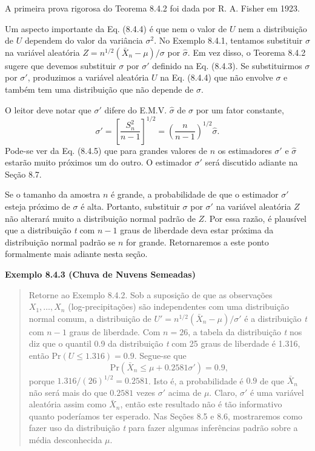 \vspace{1em}
A primeira prova rigorosa do Teorema 8.4.2 foi dada por R. A. Fisher em 1923.

Um aspecto importante da Eq. (8.4.4) é que nem o valor de $U$ nem a distribuição de $U$ dependem do valor da variância $\sigma^2$. No Exemplo 8.4.1, tentamos substituir $\sigma$ na variável aleatória $Z = n^{1/2}(\bar{X}_n - \mu)/\sigma$ por $\hat{\sigma}$. Em vez disso, o Teorema 8.4.2 sugere que devemos substituir $\sigma$ por $\sigma'$ definido na Eq. (8.4.3). Se substituirmos $\sigma$ por $\sigma'$, produzimos a variável aleatória $U$ na Eq. (8.4.4) que não envolve $\sigma$ e também tem uma distribuição que não depende de $\sigma$.

O leitor deve notar que $\sigma'$ difere do E.M.V. $\hat{\sigma}$ de $\sigma$ por um fator constante,
\begin{equation}
    \sigma' = \left[\frac{S_n^2}{n-1}\right]^{1/2} = \left(\frac{n}{n-1}\right)^{1/2} \hat{\sigma}.
\end{equation}
Pode-se ver da Eq. (8.4.5) que para grandes valores de $n$ os estimadores $\sigma'$ e $\hat{\sigma}$ estarão muito próximos um do outro. O estimador $\sigma'$ será discutido adiante na Seção 8.7.

Se o tamanho da amostra $n$ é grande, a probabilidade de que o estimador $\sigma'$ esteja próximo de $\sigma$ é alta. Portanto, substituir $\sigma$ por $\sigma'$ na variável aleatória $Z$ não alterará muito a distribuição normal padrão de $Z$. Por essa razão, é plausível que a distribuição \textit{t} com $n-1$ graus de liberdade deva estar próxima da distribuição normal padrão se $n$ for grande. Retornaremos a este ponto formalmente mais adiante nesta seção.

\vspace{1em}
\noindent\textbf{Exemplo 8.4.3 (Chuva de Nuvens Semeadas)}
\begin{quote}
    Retorne ao Exemplo 8.4.2. Sob a suposição de que as observações $X_1, \dots, X_n$ (log-precipitações) são independentes com uma distribuição normal comum, a distribuição de $U' = n^{1/2}(\bar{X}_n - \mu)/\sigma'$ é a distribuição \textit{t} com $n-1$ graus de liberdade. Com $n=26$, a tabela da distribuição \textit{t} nos diz que o quantil 0.9 da distribuição \textit{t} com 25 graus de liberdade é 1.316, então $\text{Pr}(U \le 1.316) = 0.9$. Segue-se que
    $$
    \text{Pr}(\bar{X}_n \le \mu + 0.2581\sigma') = 0.9,
    $$
    porque $1.316/(26)^{1/2} = 0.2581$. Isto é, a probabilidade é $0.9$ de que $\bar{X}_n$ não será mais do que $0.2581$ vezes $\sigma'$ acima de $\mu$. Claro, $\sigma'$ é uma variável aleatória assim como $\bar{X}_n$, então este resultado não é tão informativo quanto poderíamos ter esperado. Nas Seções 8.5 e 8.6, mostraremos como fazer uso da distribuição \textit{t} para fazer algumas inferências padrão sobre a média desconhecida $\mu$.
\end{quote}
\vspace{1em}


